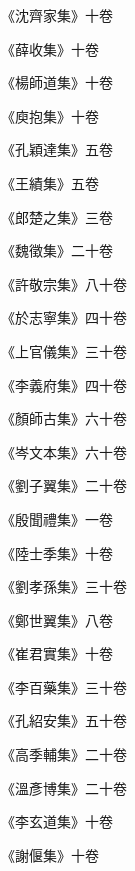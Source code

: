 \begin{pinyinscope}
 《沈齊家集》十卷



 《薛收集》十卷



 《楊師道集》十卷



 《庾抱集》十卷



 《孔穎達集》五卷



 《王績集》五卷



 《郎楚之集》三卷



 《魏徵集》二十卷



 《許敬宗集》八十卷



 《於志寧集》四十卷



 《上官儀集》三十卷



 《李義府集》四十卷



 《顏師古集》六十卷



 《岑文本集》六十卷



 《劉子翼集》二十卷



 《殷聞禮集》一卷



 《陸士季集》十卷



 《劉孝孫集》三十卷



 《鄭世翼集》八卷



 《崔君實集》十卷



 《李百藥集》三十卷



 《孔紹安集》五十卷



 《高季輔集》二十卷



 《溫彥博集》二十卷



 《李玄道集》十卷



 《謝偃集》十卷




\end{pinyinscope}
